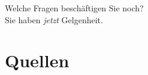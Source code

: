 \documentclass[aspectratio=169, xcolor=dvipsnames]{beamer}
\begin{document}
\begin{frame}[plain]
    \begin{center}
        \Huge{Welche Fragen beschäftigen Sie noch?}\\
        \Large{Sie haben \textit{jetzt} Gelgenheit.}
    \end{center}
\end{frame}

\section{Quellen}
\begin{frame}[allowframebreaks]{\secname}
    \nocite{*}
    \printbibliography
\end{frame}
\end{document}
